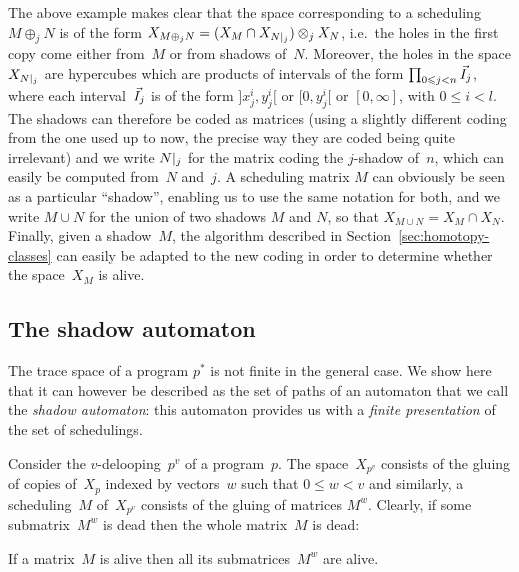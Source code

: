 \documentclass[orivec]{llncs} \usepackage[T1]{fontenc}
\newcommand{\ie}{i.e.~}
\newcommand{\glue}[1]{\oplus_{#1}}
\renewcommand{\leq}{\leqslant}
\begin{document}
The above example makes clear that the space corresponding to a scheduling
$M\glue j N$ is of the form $X_{M\glue jN}=(X_M\cap X_{\shadow jN})\otimes_j
X_N$, \ie the holes in the first copy come either from~$M$ or from shadows
of~$N$. Moreover, the holes in the space $X_{\shadow jN}$ are hypercubes which
are products of intervals of the form $\prod_{0\leq j<n}\dui_j$, where each
interval~$\dui_j$ is of the form $]x_j^i,y_j^i[$ or $[0,y_j^i[$ or $[0,\infty]$,
with $0\leq i<l$. The shadows can therefore be coded as matrices (using a
slightly different coding from the one used up to now, the precise way they are
coded being quite irrelevant) and we write $\shadow jN$ for the matrix coding
the $j$-shadow of~$n$, which can easily be computed from~$N$ and~$j$. A
scheduling matrix $M$ can obviously be seen as a particular ``shadow'', enabling
us to use the same notation for both, and we write $M\cup N$ for the union of
two shadows $M$ and $N$, so that $X_{M\cup N}=X_M\cap X_N$. Finally, given a
shadow~$M$, the algorithm described in Section~\ref{sec:homotopy-classes} can
easily be adapted to the new coding in order to determine whether the
space~$X_M$ is alive.

\subsection{The shadow automaton}
The trace space of a program $p^*$ is not finite in the general case. We show
here that it can however be described as the set of paths of an automaton that
we call the \emph{shadow automaton}: this automaton provides us with a
\emph{finite presentation} of the set of schedulings.

Consider the $v$-delooping~$p^v$ of a program~$p$. The space~$X_{p^v}$ consists
of the gluing of copies of~$X_p$ indexed by vectors~$w$ such that $0\leq w<v$
and similarly, a scheduling~$M$ of~$X_{p^v}$ consists of the gluing of matrices
$M^w$. Clearly, if some submatrix~$M^w$ is dead then the whole matrix~$M$ is
dead:

\begin{lemma}
  If a matrix~$M$ is alive then all its submatrices~$M^w$ are alive.
\end{lemma}
\end{document}
